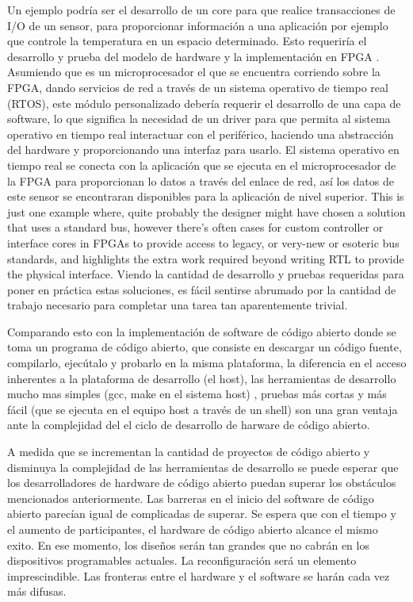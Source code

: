 Un ejemplo podría ser el desarrollo de un core para que realice transacciones de I/O de un sensor, para proporcionar información a una aplicación por ejemplo que controle la temperatura en un espacio determinado. Esto requeriría el desarrollo y prueba del modelo de hardware y la implementación en FPGA . Asumiendo que es un microprocesador el que se encuentra corriendo sobre la FPGA, dando servicios de red a través de un sistema operativo de tiempo real (RTOS), este módulo personalizado debería requerir el desarrollo de una capa de software, lo que significa la necesidad de un driver para que permita al sistema operativo en tiempo real interactuar con el periférico, haciendo una abstracción del hardware y proporcionando una interfaz para usarlo. El sistema operativo en tiempo real se conecta con la aplicación que se ejecuta en el microprocesador de la FPGA para proporcionan lo datos a través del enlace de red, así los datos de este sensor se encontraran disponibles para la aplicación de nivel superior. This is just one example where, quite probably the designer might have chosen a solution that uses a standard bus, however there’s often cases for custom controller or interface cores in FPGAs to provide
access to legacy, or very-new or esoteric bus standards, and highlights the extra work required beyond writing RTL to provide the physical interface.
Viendo la cantidad de desarrollo y pruebas requeridas para poner en práctica estas soluciones, es fácil sentirse abrumado por la cantidad de trabajo necesario para completar una tarea tan aparentemente trivial.

Comparando esto con la implementación de software de código abierto donde se toma un programa de código abierto, que consiste en descargar un código fuente, compilarlo, ejecútalo y probarlo en la misma plataforma, la diferencia en el acceso inherentes a la plataforma de desarrollo (el host), las herramientas de desarrollo mucho mas simples (gcc, make en el sistema host) , pruebas más cortas y más fácil (que se ejecuta en el equipo host a través de un shell) son una gran ventaja ante la complejidad del el ciclo de desarrollo de harware de código abierto.


A medida que se incrementan la cantidad de proyectos de código abierto y disminuya la complejidad de las herramientas de desarrollo se puede esperar que  los desarrolladores de hardware de código abierto puedan superar los obstáculos mencionados anteriormente. Las barreras en el inicio del software de código abierto parecían igual de complicadas de superar. Se espera que con el tiempo y el aumento de participantes, el hardware de código abierto alcance el mismo exito. En ese momento, los diseños serán tan grandes que no cabrán en los dispositivos programables actuales. La reconfiguración será un elemento imprescindible. Las fronteras entre el hardware y el software se harán cada vez más difusas.


